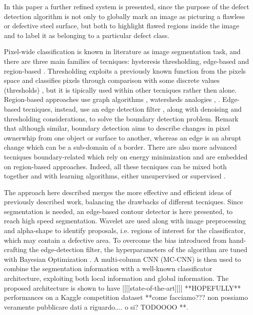     \par{
        In this paper a further refined system is presented, since the purpose of the defect detection algorithm is not only to globally mark an image as picturing a flawless or defective steel surface, but both to highlight flawed regions inside the image and to label it as belonging to a particular defect class.
    }
    \par{
        Pixel-wide classification is known in literature as image segmentation task, and there are three main families of tecniques: hysteresis thresholding, edge-based and region-based \cite{ieee:7684170}. Thresholding exploits a previously known function from the pixels space and classifies pixels through comparison with some discrete values (thresholds) \cite{ieee:4310039}, but it is tipically used within other tecniques rather then alone. Region-based approaches use graph algorithms \cite{ieee:6205760, ieee:868688}, watersheds analogies \cite{ieee:87344},  . Edge-based tecniques, instead, use an edge detection filter \cite{Klette:2014:CCV:2584519, googlescholar:kovesiphase, researchgate:phase}, along with denoising and thresholding considerations, to solve the boundary detection problem. Remark that although similar, boundary detection aims to describe changes in pixel ownerwhip from one object or surface to another, whereas an edge is an abrupt change which can be a sub-domain of a border. There are also more advanced tecniques \cite{springer:Kass1988} boundary-related which rely on energy minimization and are embedded on region-based approaches. Indeed, all these tecniques can be mixed both together and with learning algorithms, either unsupervised \cite{ieee:7684170} or supervised \cite{ieee:1273918}.
    }
    \par{
        The approach here described merges the more effective and efficient ideas of previously described work, balancing the drawbacks of different tecniques. Since segmentation is needed, an edge-based contour detector is here presented, to reach high speed segmentation. Wavelet are used along with image preprocessing and alpha-shape \cite{springer:10.1007/11907350_46} to identify proposals, i.e. regions of interest for the classificator, which may contain a defective area. To overcome the bias introduced from hand-crafting the edge-detection filter, the hyperparameters of the algorithm are tuned with Bayesian Optimization \cite{arXiv:2018arXiv180702811F, arXiv:2012arXiv1206.2944S, rasmussen:williams:2006}.
        A multi-column CNN (MC-CNN) \cite{ieee:6248110} is then used to combine the segmentation information with a well-known classificator architecture, exploiting both local information and global information. The proposed architecture is shown to have [[[[state-of-the-art]]]] **HOPEFULLY** performances on a Kaggle competition dataset **come facciamo??? non possiamo veramente pubblicare dati a riguardo.... o si? TODOOOO **.
    }